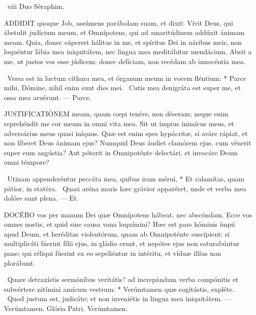 \R\ viii Duo Séraphim, 




\lettrine[lines=2]{A}{DDIDIT} quoque Job, assúmens parábolam suam, et dixit: Vivit Deus, qui ábstulit judícium meum, et Omnípotens, qui ad amaritúdinem addúxit ánimam meam. Quia, donec súperest hálitus in me, et spíritus Dei in náribus meis, non loquéntur lábia mea iniquitátem, nec lingua mea meditábitur mendácium. Absit a me, ut justos vos esse júdicem; donec defíciam, non recédam ab innocéntia mea.

\R\ Versa est in luctum cíthara mea, et órganum meum in vocem fléntium: * Parce mihi, Dómine, nihil enim sunt dies mei. \V\ Cutis mea denigráta est super me, et ossa mea aruérunt. — Parce.


\lettrine[lines=2]{J}{USTIFICATIÓNEM} meam, quam cœpi tenére, non déseram; neque enim reprehéndit me cor meum in omni vita mea. Sit ut ímpius inimícus meus, et adversárius meus quasi iníquus. Quæ est enim spes hypócritæ, si aváre rápiat, et non líberet Deus ánimam ejus? Numquid Deus áudiet clamórem ejus, cum vénerit super eum angústia? Aut póterit in Omnipoténte delectári, et invocáre Deum omni témpore?

\R\ Utinam appenderéntur peccáta mea, quibus iram mérui, * Et calamítas, quam pátior, in statéra. \V\ Quasi aréna maris hæc grávior apparéret, unde et verba mea dolóre sunt plena. — Et.



\lettrine[lines=2]{D}{OCÉBO} vos per manum Dei quæ Omnípotens hábeat, nec abscóndam. Ecce vos omnes nostis, et quid sine causa vana loquímini? Hæc est pars hóminis ímpii apud Deum, et heréditas violentórum, quam ab Omnipoténte suscípient: si multiplicáti fúerint fílii ejus, in gládio erunt, et nepótes ejus non saturabúntur pane; qui réliqui fúerint ex eo sepeliéntur in intéritu, et víduæ illíus non plorábunt.

\R\ Quare detraxístis sermónibus veritátis? ad increpándum verba compónitis et subvértere nitímini amícum vestrum: * Verúmtamen quæ cogitástis, expléte. \V\ Quod justum est, judicáte; et non inveniétis in lingua mea iniquitátem. — Verúmtamen. Glória Patri. Verúmtamen.

